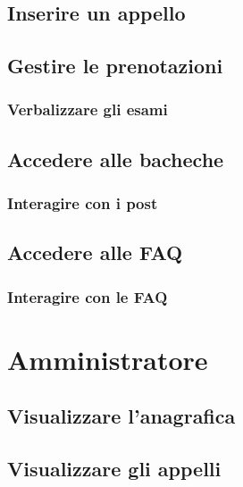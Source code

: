 \documentclass [a4paper,11pt]{book}
\begin{document}
\subsection{Inserire un appello}


\medskip

\subsection{Gestire le prenotazioni}


\subsubsection{Verbalizzare gli esami}

\medskip

\subsection{Accedere alle bacheche}


\subsubsection{Interagire con i post}

\medskip

\subsection{Accedere alle FAQ}


\subsubsection{Interagire con le FAQ}

\medskip
\medskip

\section{Amministratore}

\subsection{Visualizzare l'anagrafica}

\medskip

\subsection{Visualizzare gli appelli}
\end{document}

